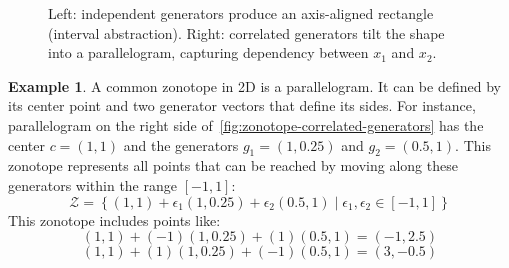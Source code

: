 \documentclass[oneside,11pt,dvipsnames]{book}
\numberwithin{equation}{section}
\theoremstyle{definition}
\newtheorem{example}{Example}[section]
\theoremstyle{remark}
\begin{document}
\begin{figure}
\centering
{}
\caption{
Left: independent generators produce an axis-aligned rectangle (interval abstraction).
Right: correlated generators tilt the shape into a parallelogram, capturing dependency between $x_1$ and $x_2$.}\label{fig:zonotope-correlated-generators}
\end{figure}


\begin{example}
    A common zonotope in 2D is a parallelogram. It can be defined by its center point and two generator vectors that define its sides. For instance, parallelogram on the right side of~\autoref{fig:zonotope-correlated-generators} has the center \(c = (1, 1)\) and the generators \(g_1 = (1, 0.25)\) and \(g_2 = (0.5, 1)\). This zonotope represents all points that can be reached by moving along these generators within the range \([-1, 1]\):
  \[
    \mathcal{Z} = \left\{ (1, 1) + \epsilon_1 (1, 0.25) + \epsilon_2 (0.5, 1) \mid \epsilon_1, \epsilon_2 \in [-1, 1] \right\}
  \]
  This zonotope includes points like:
    \[
      (1, 1) + (-1)(1, 0.25) + (1)(0.5, 1) = (-1, 2.5)
    \]
    \[
      (1, 1) + (1)(1, 0.25) + (-1)(0.5, 1) = (3, -0.5)
    \]
\end{example}
\end{document}

